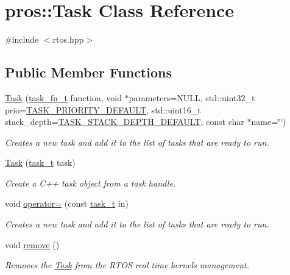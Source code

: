 \hypertarget{classpros_1_1Task}{}\section{pros\+::Task Class Reference}
\label{classpros_1_1Task}


{\ttfamily \#include $<$rtos.\+hpp$>$}

\subsection*{Public Member Functions}
\begin{DoxyCompactItemize}
\item 
\mbox{\hyperlink{classpros_1_1Task_a938ee60b49f29d743315bf05ee9f4a56}{Task}} (\mbox{\hyperlink{rtos_8h_aece0aa29b1f1538115228d2197239f98}{task\+\_\+fn\+\_\+t}} function, void $\ast$parameters=N\+U\+LL, std\+::uint32\+\_\+t prio=\mbox{\hyperlink{rtos_8h_a3082a7e8f15691441dba683711bb823f}{T\+A\+S\+K\+\_\+\+P\+R\+I\+O\+R\+I\+T\+Y\+\_\+\+D\+E\+F\+A\+U\+LT}}, std\+::uint16\+\_\+t stack\+\_\+depth=\mbox{\hyperlink{rtos_8h_a9ffb33b9e3714ca949d9f45dde3cbf8f}{T\+A\+S\+K\+\_\+\+S\+T\+A\+C\+K\+\_\+\+D\+E\+P\+T\+H\+\_\+\+D\+E\+F\+A\+U\+LT}}, const char $\ast$name=\char`\"{}\char`\"{})
\begin{DoxyCompactList}\small\item\em Creates a new task and add it to the list of tasks that are ready to run. \end{DoxyCompactList}\item 
\mbox{\hyperlink{classpros_1_1Task_a0b37b46942f1ba25513729b15a32e12f}{Task}} (\mbox{\hyperlink{rtos_8h_a1d7e0825b8d8876e8cd8ece3f9115293}{task\+\_\+t}} task)
\begin{DoxyCompactList}\small\item\em Create a C++ task object from a task handle. \end{DoxyCompactList}\item 
void \mbox{\hyperlink{classpros_1_1Task_aaaeae2788114241e149317248998781e}{operator=}} (const \mbox{\hyperlink{rtos_8h_a1d7e0825b8d8876e8cd8ece3f9115293}{task\+\_\+t}} in)
\begin{DoxyCompactList}\small\item\em Creates a new task and add it to the list of tasks that are ready to run. \end{DoxyCompactList}\item 
void \mbox{\hyperlink{classpros_1_1Task_a45269807dfc87bb1d5e9580346793e9d}{remove}} ()
\begin{DoxyCompactList}\small\item\em Removes the \mbox{\hyperlink{classpros_1_1Task}{Task}} from the R\+T\+OS real time kernel\textquotesingle{}s management. \end{DoxyCompactList}\item 

\end{DoxyCompactItemize}
